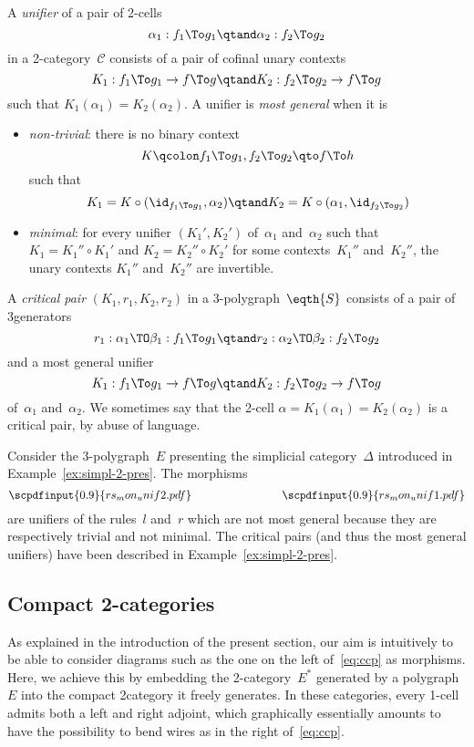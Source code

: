 \documentclass{LMCS}
\newcommand{\strid}[1]{\scpdfinput{0.9}{#1.pdf}}
\newenvironment{definition}{\begin{defi}}{\end{defi}}
\newenvironment{example}{\begin{exa}}{\end{exa}}
\renewcommand{\C}{\mathcal{C}}
\begin{document}
\begin{definition}
  \label{def:unifier}
  A \emph{unifier} of a pair of 2-cells
  \[
  \alpha_1:f_1\To g_1
  \qtand
  \alpha_2:f_2\To g_2
  \]
  in a 2-category~$\C$ consists of a pair of cofinal unary contexts
  \[
  K_1:f_1\To g_1\to f\To g
  \qtand
  K_2:f_2\To g_2\to f\To g
  \]
  such that $K_1(\alpha_1)=K_2(\alpha_2)$. A unifier is \emph{most general}
  when it is
  \begin{itemize}
  \item \emph{non-trivial}: there is no binary context
    \[
    K
    \qcolon
    f_1\To g_1,f_2\To g_2\qto f\To h
    \]
    such that
    \[
    K_1=K\circ(\id_{f_1\To g_1},\alpha_2)
    \qtand
    K_2=K\circ(\alpha_1,\id_{f_2\To g_2})
    \]
  \item \emph{minimal}: for every unifier $(K_1', K_2')$ of~$\alpha_1$
    and~$\alpha_2$ such that $K_1=K_1''\circ K_1'$ and $K_2=K_2''\circ K_2'$ for
    some contexts~$K_1''$ and~$K_2''$, the unary contexts $K_1''$ and~$K_2''$
    are invertible.
  \end{itemize}
\end{definition}

\begin{definition}
  \label{def:cp}
  A \emph{critical pair} $(K_1,r_1,K_2,r_2)$ in a 3-polygraph~$\eqth{S}$
  consists of a pair of 3\nbd{}generators
  \[
  r_1:\alpha_1\TO\beta_1:f_1\To g_1
  \qtand
  r_2:\alpha_2\TO\beta_2:f_2\To g_2
  \]
  and a most general unifier
  \[
  K_1:f_1\To g_1\to f\To g
  \qtand
  K_2:f_2\To g_2\to f\To g
  \]
  of~$\alpha_1$ and~$\alpha_2$. We sometimes say that the 2-cell
  \hbox{$\alpha=K_1(\alpha_1)=K_2(\alpha_2)$} is a critical pair, by abuse of
  language.
\end{definition}

\begin{example}
  Consider the 3-polygraph~$E$ presenting the simplicial category~$\Delta$
  introduced in Example~\ref{ex:simpl-2-pres}. The morphisms
  \[
  \strid{rs_mon_unif2}
  \qquad\qquad\qquad\qquad
  \strid{rs_mon_unif1}
  \]
  are unifiers of the rules~$l$ and~$r$ which are not most general because they
  are respectively trivial and not minimal. The critical pairs (and thus the
  most general unifiers) have been described in Example~\ref{ex:simpl-2-pres}.
\end{example}

\subsection{Compact 2-categories}
As explained in the introduction of the present section, our aim is intuitively
to be able to consider diagrams such as the one on the left of~\eqref{eq:ccp} as
morphisms. Here, we achieve this by embedding the 2-category~$E^*$ generated by
a polygraph~$E$ into the compact 2\nbd{}category it freely generates. In these
categories, every 1-cell admits both a left and right adjoint, which graphically
essentially amounts to have the possibility to bend wires as in the right
of~\eqref{eq:ccp}.
\end{document}
